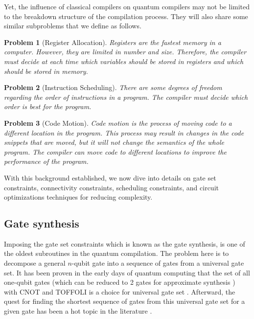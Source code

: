 \documentclass{report}
\newtheorem{problem}{Problem}
\begin{document}
{Yet, the influence of classical compilers on quantum compilers may not be limited to the breakdown structure of the compilation process. They will also share some similar subproblems that we define as follows.

\begin{problem}[Register Allocation]
  \label{prob:register_allocation}
  Registers are the fastest memory in a computer. However, they are limited in number and size. Therefore, the compiler must decide at each time which variables should be stored in registers and which should be stored in memory.~\cite[pp. 440-444]{allen2001}
\end{problem}

\begin{problem}[Instruction Scheduling]
  There are some degrees of freedom regarding the order of instructions in a program. The compiler must decide which order is best for the program.~\cite[chap. 10]{allen2001}
\end{problem}

\begin{problem}[Code Motion]
  Code motion is the process of moving code to a different location in the program. This process may result in changes in the code snippets that are moved, but it will not change the semantics of the whole program. The compiler can move code to different locations to improve the performance of the program.~\cite[p. 592]{aho1986}
\end{problem}
}


With this background established, we now dive into details on gate set constraints, connectivity constraints, scheduling constraints, and circuit optimizations techniques for reducing complexity.

\subsection{Gate synthesis}


Imposing the gate set constraints which is known as the gate synthesis, is one of the oldest subroutines in the quantum compilation. The problem here is to decompose a general $n$-qubit gate into a sequence of gates from a universal gate set. It has been proven in the early days of quantum computing that the set of all one-qubit gates (which can be reduced to 2 gates for approximate synthesis \cite{TODO}) with CNOT and TOFFOLI is a choice for universal gate set \cite{barenco1995}. Afterward, the quest for finding the shortest sequence of gates from this universal gate set for a given gate has been a hot topic in the literature \cite{shende2006,vatan2004}.
\end{document}

